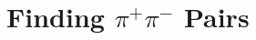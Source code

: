 \documentclass[letterpaper, abstract = on,listof=totoc, bibliography=totoc]{scrreprt}
\begin{document}




\section{Finding $\pi^+\pi^-$ Pairs}

\end{document}
